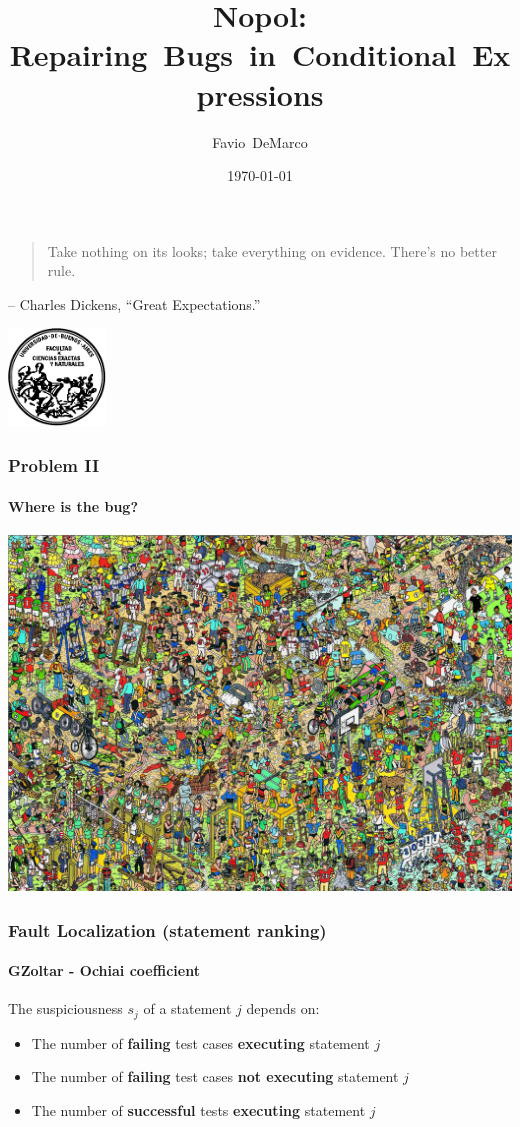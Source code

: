 \documentclass[onlymath]{beamer}
\title[{Nopol: Repairing Bugs in Conditional Expressions}]{Nopol: Repairing~Bugs~in~Conditional~Expressions}
\author[Favio DeMarco]{Favio~DeMarco}
\institute[U.B.A. - INRIA]{Universidad de Buenos Aires - INRIA}
\date{\today}
\begin{document}
  \frame
  {
\begin{quote}
    Take nothing on its looks; take everything on evidence. There's no better rule.
\end{quote}    
– Charles Dickens, ``Great Expectations.''
  }

\frame
  {
  \begin{center}
  \includegraphics[width=7em]{logofcen}
  \end{center}
    \titlepage
  }



\begin{frame}
\frametitle{Problem II}
\framesubtitle{Where is the bug?}
  \begin{center}
  \includegraphics[width=.8\paperwidth]{WheresWally}
  \end{center}
\end{frame}

\begin{frame}[fragile]
    \frametitle{Fault Localization (statement ranking)}
      \framesubtitle{GZoltar - Ochiai coefficient}
The suspiciousness $s_j$ of a statement $j$ depends on:
\begin{itemize}
 \item The number of \textbf{failing} test cases \textbf{executing} statement $j$ 
 \item The number of \textbf{failing} test cases \textbf{not executing} statement $j$
 \item The number of \textbf{successful} tests \textbf{executing} statement $j$
\end{itemize}
\end{frame}
\end{document}

